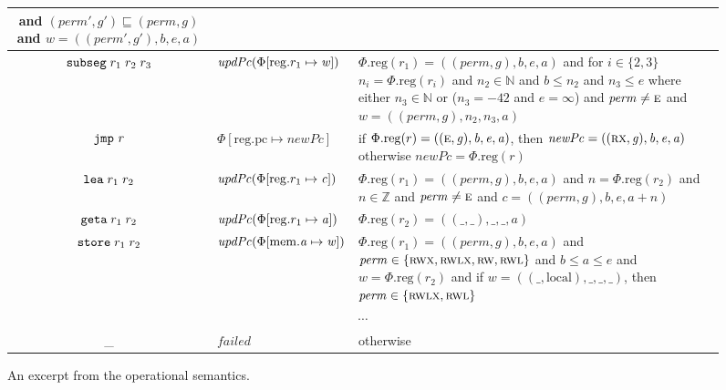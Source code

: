 \documentclass[format=acmsmall, review=true, screen=true]{acmart}
\newcommand{\update}[2]{[#1 \mapsto #2]}
\newcommand{\var}[1]{\mathit{#1}}
\newcommand{\rv}{\var{r}}
\newcommand{\lv}{\var{r}}
\newcommand{\gl}{\var{g}}
\newcommand{\pcreg}{\mathrm{pc}}
\newcommand{\addr}{\var{a}}
\newcommand{\start}{\var{b}}
\newcommand{\addrend}{\var{e}}
\newcommand{\perm}{\var{perm}}
\newcommand{\inftyend}{-42}
\newcommand{\stdcap}[1][(\perm,\gl)]{\left(#1,\start,\addrend,\addr \right)}
\newcommand{\plainproj}[1]{\mathrm{#1}}
\newcommand{\memreg}[1][\Phi]{#1.\plainproj{reg}}
\newcommand{\updateHeap}[3][\Phi]{#1\update{\plainproj{mem}.#2}{#3}}
\newcommand{\updateReg}[3][\Phi]{#1\update{\plainproj{reg}.#2}{#3}}
\newcommand{\failed}{\mathit{failed}}
\newcommand{\plainfun}[2]{
  \ifthenelse{\equal{#2}{}}
  {\mathit{#1}}
  {\mathit{#1}(#2)}
}
\newcommand{\stdUpdatePc}[1]{\plainfun{updPc}{#1}}
\newcommand{\nats}{\mathbb{N}}
\newcommand{\ints}{\mathbb{Z}}
\newcommand{\refreg}[1]{#1}
\newcommand{\refheap}[1]{#1}
\newcommand{\zinstr}[1]{\mathtt{#1}}
\newcommand{\oneinstr}[2]{
  \ifthenelse{\equal{#2}{}}
  {\zinstr{#1}}
  {\zinstr{#1} \; #2}
}
\newcommand{\jmp}[1]{\oneinstr{jmp}{#1}}
\newcommand{\twoinstr}[3]{
  \ifthenelse{\equal{#2#3}{}}
  {\zinstr{#1}}
  {\zinstr{#1} \; #2 \; #3}
}
\newcommand{\geta}[2]{\twoinstr{geta}{#1}{#2}}
\newcommand{\store}[2]{\twoinstr{store}{#1}{#2}}
\newcommand{\lea}[2]{\twoinstr{lea}{#1}{#2}}
\newcommand{\threeinstr}[4]{
  \ifthenelse{\equal{#2#3#4}{}}
  {\zinstr{#1}}
  {\zinstr{#1} \; #2 \; #3 \; #4}
}
\newcommand{\subseg}[3]{\threeinstr{subseg}{#1}{#2}{#3}}
\newcommand{\plainperm}[1]{\textsc{#1}}
\newcommand{\readwrite}{\plainperm{rw}}
\newcommand{\exec}{\plainperm{rx}}
\newcommand{\entry}{\plainperm{e}}
\newcommand{\rwx}{\plainperm{rwx}}
\newcommand{\readwritel}{\plainperm{rwl}}
\newcommand{\rwlx}{\plainperm{rwlx}}
\newcommand{\plainlocality}[1]{\mathrm{#1}}
\newcommand{\local}{\plainlocality{local}}
\newcommand{\itoplas}[1]{#1}
\begin{document}
\begin{figure}[htb]
\begin{tabular}{|c|p{3.4cm}|>{\raggedright\arraybackslash}p{7.3cm}|}
                                                                              and $(\perm',g') \sqsubseteq (\perm,g)$ and  $w =((\perm',g'),\start,\addrend,\addr)$\\
    \hline
    \itoplas{$\subseg{\refreg{r_1}}{r_2}{r_3}$} & \itoplas{$\stdUpdatePc{\updateReg{r_1}{\var{w}}}$} &  \itoplas{$\memreg(r_1) = \stdcap$ and for $i \in \{2,3\}$ $n_i = \memreg(\rv_i)$ and $n_2 \in \nats$ and $\start \leq n_2$ and $n_3 \leq \addrend$ where either $n_3 \in \nats$ or ($n_3=\inftyend$ and $\addrend = \infty$) and $\perm \neq \entry$ and $w = ((\perm,\gl),n_2,n_3,\addr)$}\\
    \hline
    $\jmp{\lv}$&$\updateReg{\pcreg}{\var{newPc}}$& if $\memreg(r) = ((\entry,\gl),\start,\addrend,\addr)$, then $\var{newPc} = ((\exec,\gl),\start,\addrend,\addr)$ otherwise $\var{newPc} = \memreg(r)$\\
    \hline
    \itoplas{$\lea{\refreg{r_1}}{r_2}$} & \itoplas{$\stdUpdatePc{\updateReg{r_1}{\var{c}}}$} &\itoplas{$\memreg(r_1) = \stdcap$ and $n = \memreg(r_2)$ and $n \in \ints $ and $\perm \neq \entry$ and $\var{c} = ((\perm,\gl),\start,\addrend,\addr + n)$} \\
    \hline
    $\geta{\refreg{r_1}}{\refreg{r_2}}$ & $\stdUpdatePc{\updateReg{r_1}{\addr}}$ &
                                                $\memreg(r_2) = ((\_,\_),\_,\_,\addr)$\\
    \hline
    $\store{\refheap{r_1}}{\refreg{r_2}}$&$\stdUpdatePc{\updateHeap{\addr}{\var{w}}}$&$\memreg(r_1) = \stdcap$ and $\perm \in \{ \rwx, \rwlx, \readwrite, \readwritel\}$  and $\start \leq \addr \leq \addrend$ and $\var{w} = \memreg(r_2)$
                                                                                       and if $\var{w} = ((\_,\local),\_,\_,\_)$, then $\perm \in \{\rwlx,\readwritel \}$\\
    \hline
    \multicolumn{3}{|c|}{$\cdots$}\\
    \hline
    \_&$\failed$&otherwise\\
    \hline
  \end{tabular}
  \caption{An excerpt from the operational semantics.}
  \label{fig:op-sem}
\end{figure}
\end{document}
